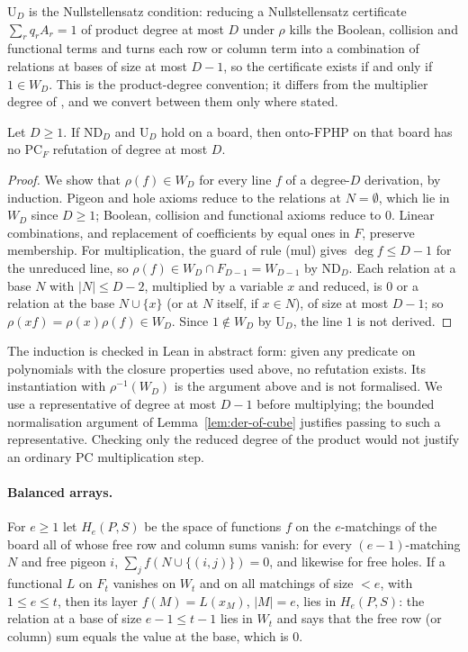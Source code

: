 $\mathrm{U}_D$ is the Nullstellensatz condition: reducing a Nullstellensatz certificate
$\sum_r q_rA_r=1$ of product degree at most $D$ under $\rho$ kills the Boolean, collision
and functional terms and turns each row or column term into a combination of relations
at bases of size at most $D-1$, so the certificate exists if and only if $1\in W_D$.  This
is the product-degree convention; it differs from the multiplier degree of
\cite{beame1998counting}, and we convert between them only where stated.

\begin{proposition}\label{prop:nd-pc}
Let $D\ge1$.  If $\mathrm{ND}_D$ and $\mathrm{U}_D$ hold on a board, then
$\mathrm{onto\text{-}FPHP}$ on that board has no $\mathrm{PC}_F$ refutation of degree at
most $D$.
\end{proposition}

\begin{proof}
We show that $\rho(f)\in W_D$ for every line $f$ of a degree-$D$ derivation, by induction.
Pigeon and hole axioms reduce to the relations at $N=\emptyset$, which lie in $W_D$ since
$D\ge1$; Boolean, collision and functional axioms reduce to $0$.  Linear combinations, and
replacement of coefficients by equal ones in $F$, preserve membership.  For
multiplication, the guard of rule (mul) gives $\deg f\le D-1$ for the unreduced line, so
$\rho(f)\in W_D\cap F_{D-1}=W_{D-1}$ by $\mathrm{ND}_D$.  Each relation at a base $N$ with
$|N|\le D-2$, multiplied by a variable $x$ and reduced, is $0$ or a relation at the base
$N\cup\{x\}$ (or at $N$ itself, if $x\in N$), of size at most $D-1$; so
$\rho(xf)=\rho(x)\rho(f)\in W_D$.  Since $1\notin W_D$ by $\mathrm{U}_D$, the line $1$ is
not derived.
\end{proof}

The induction is checked in Lean in abstract form: given any predicate on polynomials with
the closure properties used above, no refutation exists.
Its instantiation with $\rho^{-1}(W_D)$ is the argument above and is not formalised.  We use a
representative of degree at most $D-1$ before multiplying; the bounded normalisation
argument of Lemma~\ref{lem:der-of-cube} justifies passing to such a representative.  Checking
only the reduced degree of the product would not justify an ordinary PC multiplication
step.

\paragraph{Balanced arrays.}  For $e\ge1$ let $H_e(P,S)$ be the space of functions $f$ on
the $e$-matchings of the board all of whose free row and column sums vanish: for every
$(e-1)$-matching $N$ and free pigeon $i$, $\sum_j f(N\cup\{(i,j)\})=0$, and likewise for
free holes.  If a functional $L$ on $F_t$ vanishes on $W_t$ and on all matchings of size
$<e$, with $1\le e\le t$, then its layer $f(M)=L(x_M)$, $|M|=e$, lies in $H_e(P,S)$: the
relation at a base of size $e-1\le t-1$ lies in $W_t$ and says that the free row (or column)
sum equals the value at the base, which is $0$.

\endgroup
